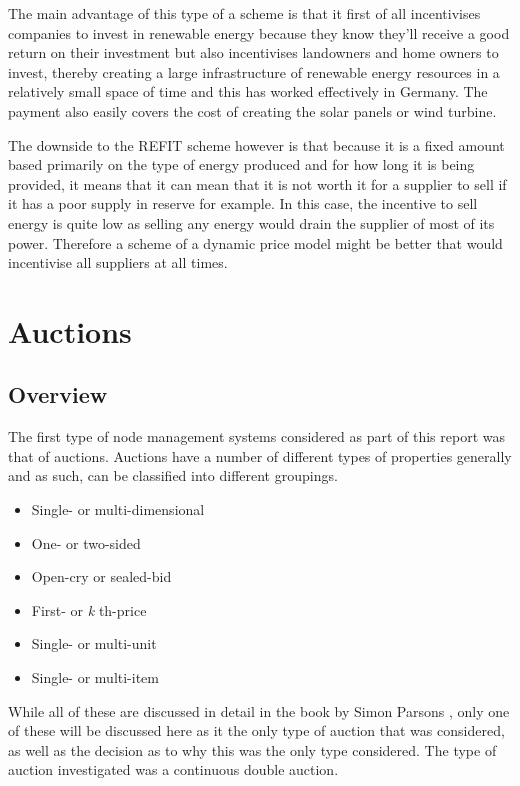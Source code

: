 \documentclass[a4paper, notitlepage]{report}
\begin{document}
The main advantage of this type of a scheme is that it first of all incentivises
companies to invest in renewable energy because they know they'll receive a good
return on their investment but also incentivises landowners and home owners to
invest, thereby creating a large infrastructure of renewable energy resources in
a relatively small space of time and this has worked effectively in Germany. The
payment also easily covers the cost of creating the solar panels or wind
turbine.

The downside to the REFIT scheme however is that because it is a fixed amount
based primarily on the type of energy produced and for how long it is being
provided, it means that it can mean that it is not worth it for a supplier to
sell if it has a poor supply in reserve for example. In this case, the incentive
to sell energy is quite low as selling any energy would drain the supplier of
most of its power. Therefore a scheme of a dynamic price model might be better
that would incentivise all suppliers at all times.
\chapter{Auctions}
\label{sec:org682c803}
\section{Overview}
\label{sec:org9716738}
The first type of node management systems considered as part of this report was
that of auctions. Auctions have a number of different types of properties
generally and as such, can be classified into different groupings.

\begin{itemize}
\item Single- or multi-dimensional
\item One- or two-sided
\item Open-cry or sealed-bid
\item First- or \emph{k} th-price
\item Single- or multi-unit
\item Single- or multi-item
\end{itemize}

While all of these are discussed in detail in the book by Simon Parsons
\cite{parsons2011auctions}, only one of these will be discussed here as it the
only type of auction that was considered, as well as the decision as to why this
was the only type considered. The type of auction investigated was a continuous
double auction.
\end{document}
